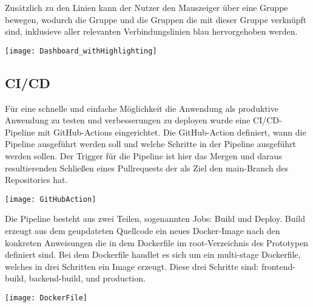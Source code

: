 Zusätzlich zu den Linien kann der Nutzer den Mauszeiger über eine Gruppe bewegen, wodurch die Gruppe und die Gruppen die mit dieser Gruppe verknüpft sind, inklusieve aller relevanten Verbindungslinien blau hervorgehoben werden.

\vspace{20pt}
\begin{center}
    \begin{minipage}{1\linewidth}
        \texttt{[image: Dashboard\_withHighlighting]}
    \end{minipage}
\end{center}
\vspace{20pt}

\subsection{CI/CD}
Für eine schnelle und einfache Möglichkeit die Anwendung als produktive Anwendung zu testen und verbesserungen zu deployen wurde eine CI/CD-Pipeline mit GitHub-Actions eingerichtet. Die GitHub-Action definiert, wann die Pipeline ausgeführt werden soll und welche Schritte in der Pipeline ausgeführt werden sollen. Der Trigger für die Pipeline ist hier das Mergen und daraus resultierenden Schließen eines Pullrequests der als Ziel den main-Branch des Repositories hat.

\vspace{20pt}
\begin{center}
    \begin{minipage}{1\linewidth}
        \texttt{[image: GitHubAction]}
    \end{minipage}
\end{center}
\vspace{20pt}

Die Pipeline besteht aus zwei Teilen, sogenannten Jobs: Build und Deploy.
Build erzeugt aus dem geupdateten Quellcode ein neues Docker-Image nach den konkreten Anweisungen die in dem Dockerfile im root-Verzeichnis des Prototypen definiert sind. Bei dem Dockerfile handlet es sich um ein multi-stage Dockerfile, welches in drei Schritten ein Image erzeugt. Diese drei Schritte sind:
frontend-build, backend-build, und production.

\vspace{20pt}
\begin{center}
    \begin{minipage}{1\linewidth}
        \texttt{[image: DockerFile]}
    \end{minipage}
\end{center}
\vspace{20pt}


